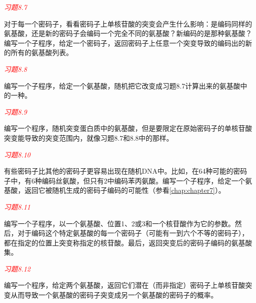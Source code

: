 \textcolor{red}{\textit{习题8.7}}
\begin{adjustwidth}{2em}{}
对于每一个密码子，看看密码子上单核苷酸的突变会产生什么影响：是编码同样的氨基酸，还是新的密码子会编码一个完全不同的氨基酸？新编码的是那种氨基酸？编写一个子程序，给定一个密码子，返回密码子上任意一个突变导致的编码出的新的所有的氨基酸列表。
\end{adjustwidth}

\textcolor{red}{\textit{习题8.8}}
\begin{adjustwidth}{2em}{}
编写一个子程序，给定一个氨基酸，随机把它改变成习题8.7计算出来的氨基酸中的一种。
\end{adjustwidth}

\textcolor{red}{\textit{习题8.9}}
\begin{adjustwidth}{2em}{}
编写一个程序，随机突变蛋白质中的氨基酸，但是要限定在原始密码子的单核苷酸突变能导致的突变范围内，就像习题8.7和8.8中的那样。
\end{adjustwidth}

\textcolor{red}{\textit{习题8.10}}
\begin{adjustwidth}{2em}{}
有些密码子比其他的密码子更容易出现在随机DNA中。比如，在64种可能的密码子中，有6种编码丝氨酸，但只有2中编码苯丙氨酸。编写一个子程序，给定一个氨基酸，返回它被随机生成的密码子编码的可能性（参看\autoref{chap:chapter7}）。
\end{adjustwidth}

\textcolor{red}{\textit{习题8.11}}
\begin{adjustwidth}{2em}{}
编写一个子程序，以一个氨基酸、位置1、2或3和一个核苷酸作为它的参数。然后，对于编码这个特定氨基酸的每一个密码子（可能有一到六个不等的密码子），都在指定的位置上突变称指定的核苷酸。最后，返回突变后的密码子编码的氨基酸集。
\end{adjustwidth}

\textcolor{red}{\textit{习题8.12}}
\begin{adjustwidth}{2em}{}
编写一个程序，给定两个氨基酸，返回它们潜在（而非指定）密码子上单核苷酸突变从而导致一个氨基酸的密码子突变成另一个氨基酸的密码子的概率。
\end{adjustwidth}

